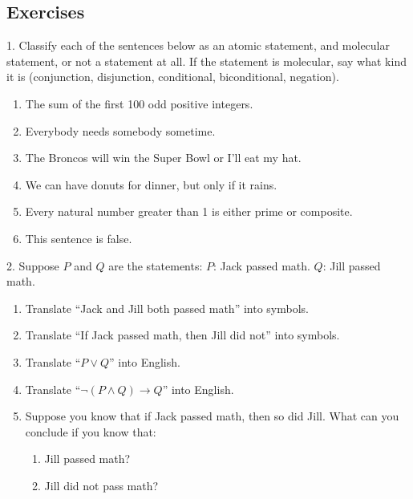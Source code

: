 \documentclass[10pt,]{book}
\theoremstyle{plain}
\theoremstyle{definition}
\numberwithin{equation}{chapter}
\def\imp{\rightarrow}
\begin{document}
\subsection[Exercises]{Exercises}\label{exercises_intro-statements}
\begin{exerciselist}
\item[1.]\hypertarget{exercise-1}{}Classify each of the sentences below as an atomic statement, and molecular statement, or not a statement at all.  If the statement is molecular, say what kind it is (conjunction, disjunction, conditional, biconditional, negation).
        \leavevmode%
\begin{enumerate}[label=(\alph*)]
\item\hypertarget{li-1}{}The sum of the first 100 odd positive integers.%
\item\hypertarget{li-2}{}Everybody needs somebody sometime.%
\item\hypertarget{li-3}{}The Broncos will win the Super Bowl or I'll eat my hat.%
\item\hypertarget{li-4}{}We can have donuts for dinner, but only if it rains.%
\item\hypertarget{li-5}{}Every natural number greater than 1 is either prime or composite.%
\item\hypertarget{li-6}{}This sentence is false.%
\end{enumerate}

\par\smallskip
\item[2.]\hypertarget{exercise-2}{}
    Suppose \(P\) and \(Q\) are the statements:
    \(P\): Jack passed math.
    \(Q\): Jill passed math.
\leavevmode%
\begin{enumerate}[label=(\alph*)]
\item\hypertarget{li-13}{} Translate ``Jack and Jill both passed math'' into symbols. %
\item\hypertarget{li-14}{} Translate ``If Jack passed math, then Jill did not'' into symbols. %
\item\hypertarget{li-15}{} Translate ``\(P \vee Q\)'' into English. %
\item\hypertarget{li-16}{} Translate ``\(\neg(P \wedge Q) \imp Q\)'' into English. %
\item\hypertarget{li-17}{} Suppose you know that if Jack passed math, then so did Jill.  What can you conclude if you know that:
\begin{enumerate}[label=\roman*.]
\item\hypertarget{li-18}{} Jill passed math?  %
\item\hypertarget{li-19}{}  Jill did not pass math?%
\end{enumerate}


\end{enumerate}
\end{exerciselist}
\end{document}
